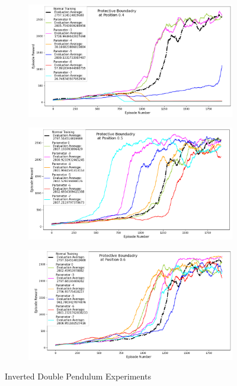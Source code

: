 \documentclass[journal]{IEEEtran}
\begin{document}
\begin{figure}
    \centering
    \begin{subfigure}[b]{0.5\textwidth}
      \centering
      \includegraphics[width=\textwidth]{Double_Pendulum_with_Boundary_at_0.4.png}
    \end{subfigure}
    \vspace*{0.0mm}
    \begin{subfigure}[b]{0.5\textwidth}
      \centering
      \includegraphics[width=\textwidth]{Double_Pendulum_with_Boundary_at_0.5.png}
    \end{subfigure}
    \vspace*{0.0mm}
    \begin{subfigure}[b]{0.5\textwidth}
      \centering
      \includegraphics[width=\textwidth]{Double_Pendulum_with_Boundary_at_0.6.png}
    \end{subfigure}
    \caption{Inverted Double Pendulum Experiments}
    \label{fig:Double Pendulum}
\end{figure}
\end{document}
